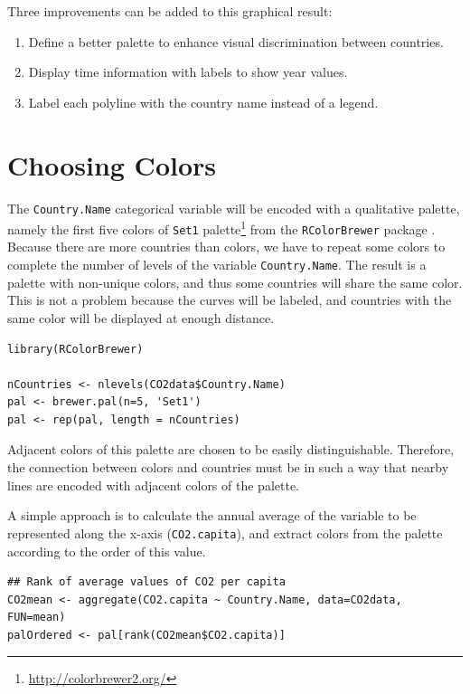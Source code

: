 Three improvements can be added to this graphical result: 
\begin{enumerate}
\item Define a better palette to enhance visual discrimination between
countries.
\item Display time information with labels to show year values.
\item Label each polyline with the country name instead of a legend.
\end{enumerate}
\section{Choosing Colors}
\label{sec-2}
The \texttt{Country.Name} categorical variable will be encoded with a
qualitative palette, namely the first five colors of \texttt{Set1}
palette\footnote{\url{http://colorbrewer2.org/}} from the \texttt{RColorBrewer} package
\cite{Neuwirth2011}. Because there are more countries than colors, we
have to repeat some colors to complete the number of levels of the
variable \texttt{Country.Name}. The result is a palette with non-unique
colors, and thus some countries will share the same color. This is not
a problem because the curves will be labeled, and countries with the
same color will be displayed at enough distance.


\lstset{language=R,numbers=none}
\begin{lstlisting}
library(RColorBrewer)

nCountries <- nlevels(CO2data$Country.Name)
pal <- brewer.pal(n=5, 'Set1')
pal <- rep(pal, length = nCountries)
\end{lstlisting}

Adjacent colors of this palette are chosen to be easily
distinguishable. Therefore, the connection between colors and
countries must be in such a way that nearby lines are encoded
with adjacent colors of the palette.

A simple approach is to calculate the annual average of the
variable to be represented along the x-axis (\texttt{CO2.capita}), and
extract colors from the palette according to the order of this
value.  


\lstset{language=R,numbers=none}
\begin{lstlisting}
## Rank of average values of CO2 per capita
CO2mean <- aggregate(CO2.capita ~ Country.Name, data=CO2data, FUN=mean)
palOrdered <- pal[rank(CO2mean$CO2.capita)]
\end{lstlisting}

